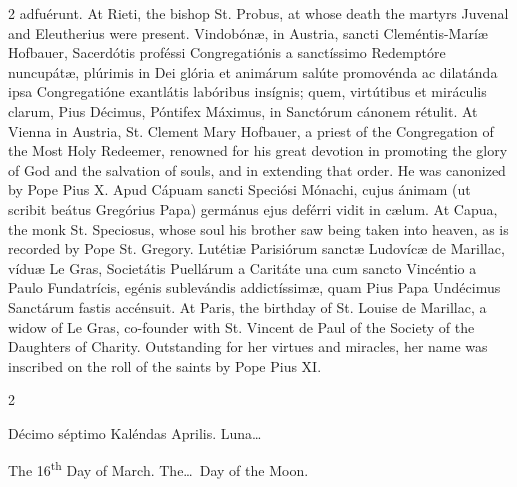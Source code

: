 \begin{paracol}{2}
 adfuérunt.
\switchcolumn
{}
At Rieti, the bishop St. Probus, at whose death the martyrs Juvenal and 
 Eleutherius were present.
\switchcolumn*
{}
Vindobónæ, in Austria, sancti Cleméntis-Maríæ 
 Hofbauer, Sacerdótis proféssi Congregatiónis a sanctíssimo Redemptóre 
 nuncupátæ, plúrimis in Dei glória et animárum salúte promovénda ac dilatánda 
 ipsa Congregatióne exantlátis labóribus insígnis; quem, virtútibus et 
 miráculis clarum, Pius Décimus, Póntifex Máximus, in Sanctórum cánonem 
 rétulit.
\switchcolumn
{}
At Vienna in Austria, St. Clement Mary Hofbauer, a priest of the 
 Congregation of the Most Holy Redeemer, renowned for his great devotion in 
 promoting the glory of God and the salvation of souls, and in extending that 
 order. He was canonized by Pope Pius X.
\switchcolumn*
{}
Apud Cápuam sancti Speciósi Mónachi, cujus ánimam (ut scribit beátus 
 Gregórius Papa) germánus ejus deférri vidit in cælum.
\switchcolumn
{}
At Capua, the monk St. Speciosus, whose soul his brother saw being 
 taken into heaven, as is recorded by Pope St. Gregory.
\switchcolumn*
{}
Lutétiæ Parisiórum sanctæ Ludovícæ de Marillac, 
 víduæ Le Gras, Societátis Puellárum a Caritáte una cum sancto Vincéntio a 
 Paulo Fundatrícis, egénis sublevándis addictíssimæ, quam Pius Papa Undécimus 
 Sanctárum fastis accénsuit.
\switchcolumn
{}
At Paris, the birthday of St. Louise de Marillac, a widow of Le Gras, 
 co-founder with St. Vincent de Paul of the Society of the Daughters of 
 Charity. Outstanding for her virtues and miracles, her name was 
 inscribed on the roll of the saints by Pope Pius XI.
\switchcolumn*
{}
\end{paracol}


\begin{paracol}{2}
\begin{center}{\color{gregoriocolor} Décimo séptimo Kaléndas Aprilis. 
 Luna\dots\ }\end{center}
\switchcolumn
{}
\begin{center}{\color{gregoriocolor} The 16\textsuperscript{th} Day of March. 
 The\dots\ Day of the Moon.}\end{center}
\end{paracol}

